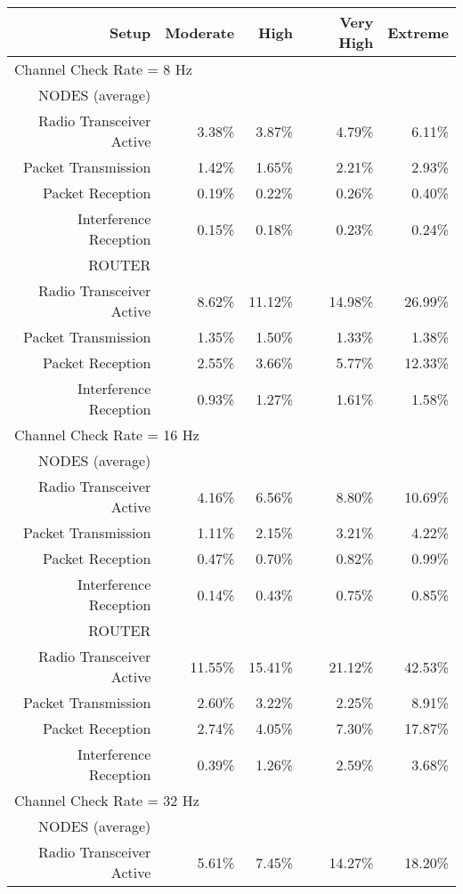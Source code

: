 \documentclass[a4paper,twoside]{article}
\begin{document}
\begin{subtables}
\begin{table*}[htbp]
\centering
\begin{tabular}{|r|r|r|r|r|}
\hline
Setup & Moderate & High & Very High & Extreme \\
\hline
\multicolumn{5}{|l|}{Channel Check Rate = 8 Hz}\\
\hline
NODES (average) & & & & \\
Radio Transceiver Active & 3.38\% & 3.87\% & 4.79\% & 6.11\% \\
Packet Transmission & 1.42\% & 1.65\% & 2.21\% & 2.93\% \\
Packet Reception & 0.19\% & 0.22\% & 0.26\% & 0.40\% \\
Interference Reception & 0.15\% & 0.18\% & 0.23\% & 0.24\% \\
ROUTER & & & & \\
Radio Transceiver Active & 8.62\% & 11.12\% & 14.98\% & 26.99\% \\
Packet Transmission & 1.35\% & 1.50\% & 1.33\% & 1.38\% \\
Packet Reception & 2.55\% & 3.66\% & 5.77\% & 12.33\% \\
Interference Reception & 0.93\% & 1.27\% & 1.61\% & 1.58\% \\
\hline
\multicolumn{5}{|l|}{Channel Check Rate = 16 Hz}\\
\hline
NODES (average) & & & & \\
Radio Transceiver Active & 4.16\% & 6.56\% & 8.80\% & 10.69\% \\
Packet Transmission & 1.11\% & 2.15\% & 3.21\% & 4.22\% \\
Packet Reception & 0.47\% & 0.70\% & 0.82\% & 0.99\% \\
Interference Reception & 0.14\% & 0.43\% & 0.75\% & 0.85\% \\
ROUTER & & & & \\
Radio Transceiver Active & 11.55\% & 15.41\% & 21.12\% & 42.53\% \\
Packet Transmission & 2.60\% & 3.22\% & 2.25\% & 8.91\% \\
Packet Reception & 2.74\% & 4.05\% & 7.30\% & 17.87\% \\
Interference Reception & 0.39\% & 1.26\% & 2.59\% & 3.68\% \\
\hline
\multicolumn{5}{|l|}{Channel Check Rate = 32 Hz}\\
\hline
NODES (average) & & & & \\
Radio Transceiver Active & 5.61\% & 7.45\% & 14.27\% & 18.20\% \\

\end{tabular}
\end{table*}
\end{subtables}
\end{document}
